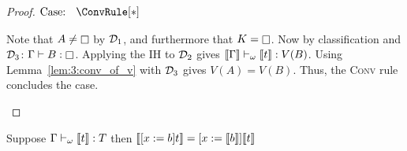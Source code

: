 \begin{proof}
    $\text{Case: }\begin{array}{c} \ConvRule[*] \end{array}$
    \begin{proofcase}
        Note that $A \neq \kind$ by $\mathcal{D}_{1}$, and furthermore that $K = \kind$.
        Now by classification and $\mathcal{D}_{3}$: $\Gamma \vdash B : \kind$.
        Applying the IH to $\mathcal{D}_{2}$ gives $\llbracket \Gamma \rrbracket \vdash_\omega \llbracket t \rrbracket : V(B)$.
        Using Lemma~\ref{lem:3:conv_of_v} with $\mathcal{D}_{3}$ gives $V(A) = V(B)$.
        Thus, the \textsc{Conv} rule concludes the case.
    \end{proofcase}
\end{proof}

\begin{lemma}
    \label{lem:3:sema_subst}
    Suppose $\Gamma \vdash_\omega \llbracket t \rrbracket : T$ then $\llbracket [x := b]t \rrbracket = [x := \llbracket b \rrbracket]\llbracket t \rrbracket$
\end{lemma}
